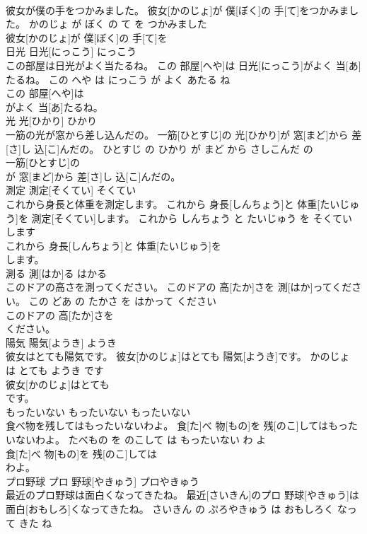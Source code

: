 \documentclass[8pt]{extreport}
\begin{document}
\begin{CJK}{UTF8}{min}
\\	彼女が僕の手をつかみました。	彼女[かのじょ]が 僕[ぼく]の 手[て]をつかみました。	かのじょ が ぼく の て を つかみました	
\\	彼女[かのじょ]が 僕[ぼく]の 手[て]を
\\	日光	日光[にっこう]	にっこう	
\\	この部屋は日光がよく当たるね。	この 部屋[へや]は 日光[にっこう]がよく 当[あ]たるね。	この へや は にっこう が よく あたる ね	
\\	この 部屋[へや]は
\\	がよく 当[あ]たるね。			
\\	光	光[ひかり]	ひかり	
\\	一筋の光が窓から差し込んだの。	一筋[ひとすじ]の 光[ひかり]が 窓[まど]から 差[さ]し 込[こ]んだの。	ひとすじ の ひかり が まど から さしこんだ の	
\\	一筋[ひとすじ]の
\\	が 窓[まど]から 差[さ]し 込[こ]んだの。			
\\	測定	測定[そくてい]	そくてい	
\\	これから身長と体重を測定します。	これから 身長[しんちょう]と 体重[たいじゅう]を 測定[そくてい]します。	これから しんちょう と たいじゅう を そくてい します	
\\	これから 身長[しんちょう]と 体重[たいじゅう]を
\\	します。			
\\	測る	測[はか]る	はかる	
\\	このドアの高さを測ってください。	このドアの 高[たか]さを 測[はか]ってください。	この どあ の たかさ を はかって ください	
\\	このドアの 高[たか]さを
\\	ください。			
\\	陽気	陽気[ようき]	ようき	
\\	彼女はとても陽気です。	彼女[かのじょ]はとても 陽気[ようき]です。	かのじょ は とても ようき です	
\\	彼女[かのじょ]はとても
\\	です。			
\\	もったいない	もったいない	もったいない	
\\	食べ物を残してはもったいないわよ。	食[た]べ 物[もの]を 残[のこ]してはもったいないわよ。	たべもの を のこして は もったいない わ よ	
\\	食[た]べ 物[もの]を 残[のこ]しては
\\	わよ。			
\\	プロ野球	プロ 野球[やきゅう]	プロやきゅう	
\\	最近のプロ野球は面白くなってきたね。	最近[さいきん]のプロ 野球[やきゅう]は 面白[おもしろ]くなってきたね。	さいきん の ぷろやきゅう は おもしろく なって きた ね	

\end{CJK}
\end{document}
